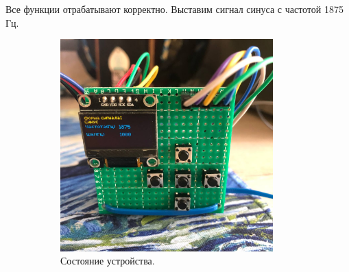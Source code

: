 %	
%	
%	

	Все функции отрабатывают корректно. Выставим сигнал синуса с частотой 1875 Гц.
	
	\begin{figure}[H]\captionsetup[subfigure]{font=normalsize}
     \begin{subfigure}[H]{0.5\textwidth}
         \centering
         \includegraphics[width=0.9\textwidth]{../image/test4_u_f.jpg}
         \caption{Состояние устройства.}
    	\end{subfigure}
     \hfill
     \begin{subfigure}[H]{0.5\textwidth}
         \centering

\end{subfigure}
\end{figure}
